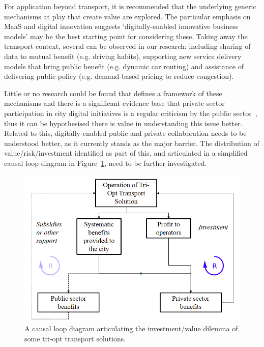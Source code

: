 \documentclass[journal]{IEEEtran}
\begin{document}
For application beyond transport, it is recommended that the
underlying generic mechanisms at play that create value are
explored. The particular emphasis on MaaS and digital innovation
suggests `digitally-enabled innovative business models' may be the
best starting point for considering these. Taking away the transport
context, several can be observed in our research: including sharing of
data to mutual benefit (e.g. driving habits), supporting new service
delivery models that bring public benefit (e.g. dynamic car routing)
and assistance of delivering public policy (e.g. demand-based pricing
to reduce congestion).

Little or no research could be found that defines a framework of these
mechanisms and there is a significant evidence base that private
sector participation in city digital initiatives is a regular
criticism by the public sector~\cite{martin:2016}, thus it can be
hypothesised there is value in understanding this issue
better. Related to this, digitally-enabled public and private
collaboration needs to be understood better, as it currently stands as
the major barrier. The distribution of value/risk/investment
identified as part of this, and articulated in a simplified causal
loop diagram in Figure~\ref{fig:causalloop}, need to be further
investigated.

\begin{figure}[!htb]
\centering
\includegraphics[width=\columnwidth]{images/causalloop.png}
\caption{A causal loop diagram articulating the investment/value
  dilemma of some tri-opt transport solutions.}
\label{fig:causalloop}
\end{figure}

\end{document}
